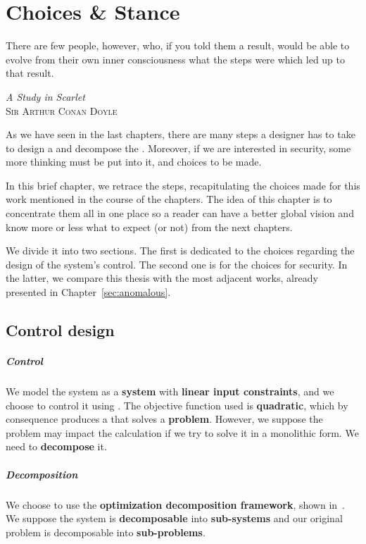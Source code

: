 \documentclass[../main.tex]{subfiles}
\begin{document}
\chapter*{Choices \& Stance}\label{sec:positioning}
\epigraph{\centering There are few people, however, who, if you told them a result, would be able to evolve from their own inner consciousness what the steps were which led up to that result.}
{\textit{A Study in Scarlet}\\ \textsc{Sir Arthur Conan Doyle}}
As we have seen in the last chapters, there are many steps a designer has to take to design a \cps{} and decompose the \mpc{}.
Moreover, if we are interested in security, some more thinking must be put into it, and choices to be made.

In this brief chapter, we retrace the steps, recapitulating the choices made for this work mentioned in the course of the chapters.
The idea of this chapter is to concentrate them all in one place so a reader can have a better global vision and know more or less what to expect (or not) from the next chapters.

We divide it into two sections.
The first is dedicated to the choices regarding the design of the system's control.
The second one is for the choices for security.
In the latter, we compare this thesis with the most adjacent works, already presented in Chapter~\ref{sec:anomalous}.

\section*{Control design}
\paragraph*{Control}\label{sec:control_chosen}
We model the system as a \textbf{\ltidt{} system} with \textbf{linear input constraints}, and we choose to control it using \textbf{\mpc{}}.
The objective function used is \textbf{quadratic}, which by consequence produces a \mpc{} that solves a \textbf{\qp{} problem}.
However, we suppose the problem may impact the calculation if we try to solve it in a monolithic form. We need to \textbf{decompose} it.

\paragraph*{Decomposition}\label{sec:decomposition_chosen}
We choose to use the \textbf{optimization decomposition framework}, shown in~\cite{ConejoEtAl2006,BoydEtAl2015}.
We suppose the system is \textbf{decomposable} into \textbf{sub-systems} and our original problem is decomposable into \textbf{sub-problems}.
\end{document}
